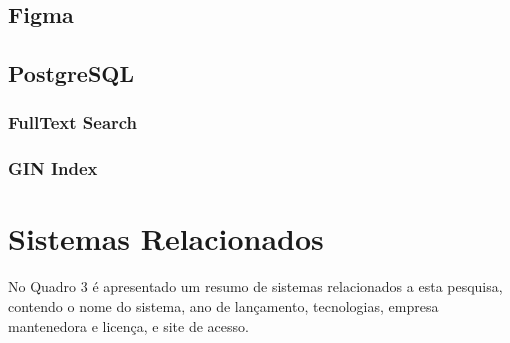 \subsection{Figma}

\subsection{PostgreSQL}
\subsubsection{FullText Search}
\subsubsection{GIN Index}

\section{Sistemas Relacionados}\label{sec:rs}
No Quadro 3 é apresentado um resumo de sistemas relacionados
a esta pesquisa, contendo o nome do sistema, ano de lançamento, tecnologias,
empresa mantenedora e licença, e site de acesso.


